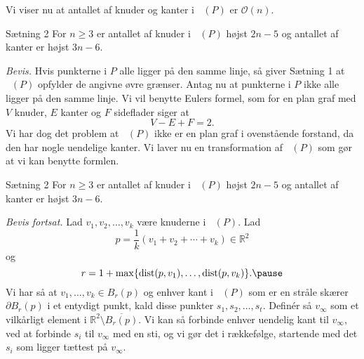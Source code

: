 \documentclass{beamer} %
\newcommand{\R}{\mathbb{R}}
\newcommand{\curly}[1]{\{#1\}}
\newcommand{\longpause}{\break \break \pause}
\DeclareMathOperator{\dist}{dist}
\DeclareMathOperator{\VorG}{Vor_{G}}
\begin{document}
\begin{comment}
\begin{frame}
\begin{block}{Sætning 1}
Hvis alle punkter i $P$ ligger på den samme linje, så består $\VorG(P)$ af $n - 1$ parallelle linjer.
Hvis ikke, så er $\VorG(P)$ sammenhængende, og kanterne er enten linjestykker eller stråler.
\end{block}
\textit{Bevis fortsat.} \pause Vi viser nu at $\VorG(P)$ er sammenhængende. \pause Antag for modstrid at $\VorG(P)$ ikke er sammenhængende. \pause Så findes $\partial \mathcal{V}(p_i)$ som ikke er stisammenhængende. \pause Det kan kun ske hvis $\partial \mathcal{V}(p_i)$ består af to parallelle linjer\pause, hvilket er i modstrid med at $\VorG(P)$ ikke indeholder nogen linjer. \pause Altså er $\VorG(P)$ sammenhængende. \textbf{QED.}
\end{frame}

\end{comment}

\begin{frame}
\pause
Vi viser nu at antallet af knuder og kanter i $\VorG(P)$ er $\mathcal{O}(n)$.
\pause
\begin{block}{Sætning 2}
\pause
For $n \geq 3$ er antallet af knuder i $\VorG(P)$ højst $2n - 5$ \pause og antallet af kanter er højst $3n - 6$.
\end{block}
\pause \textit{Bevis.} \pause Hvis punkterne i $P$ alle ligger på den samme linje, så giver Sætning 1 at $\VorG(P)$ opfylder de angivne øvre grænser.
\longpause
Antag nu at punkterne i $P$ ikke alle ligger på den samme linje. \pause Vi vil benytte Eulers formel, som for en plan graf med \pause $V$ knuder, \pause $E$ kanter \pause og $F$ sideflader \pause siger at
\[
	V - E + F = 2.
\]
\pause Vi har dog det problem at $\VorG(P)$ ikke er en plan graf i ovenstående forstand, da den har nogle uendelige kanter. \pause Vi laver nu en transformation af $\VorG(P)$ som gør at vi kan benytte formlen.
\end{frame}

\begin{frame}
\begin{block}{Sætning 2}
For $n \geq 3$ er antallet af knuder i $\VorG(P)$ højst $2n - 5$ og antallet af kanter er højst $3n - 6$.
\end{block}
\textit{Bevis fortsat.} \pause Lad $v_1, v_2, \ldots, v_k$ være knuderne i $\VorG(P)$. \pause Lad
\[
	p = \frac{1}{k} (v_1 + v_2 + \cdots + v_k) \in \R^2
\]
\pause og
\[
	r = 1 + \max\curly{\dist(p, v_1), \ldots, \dist(p, v_k)}. \pause
\]
Vi har så at $v_1, \ldots, v_k \in B_r(p)$ \pause og enhver kant i $\VorG(P)$ som er en stråle skærer $\partial B_r(p)$ i et entydigt punkt\pause, kald disse punkter $s_1, s_2, \ldots, s_t$. \pause Definér så $v_{\infty}$ som et vilkårligt element i $\R^2 \setminus \overline{B_r(p)}$. \pause Vi kan så forbinde enhver uendelig kant til $v_{\infty}$\pause, ved at forbinde $s_i$ til $v_{\infty}$ med en sti\pause, og vi gør det i rækkefølge, startende med det $s_i$ som ligger tættest på $v_{\infty}$.
\end{frame}
\end{document}
